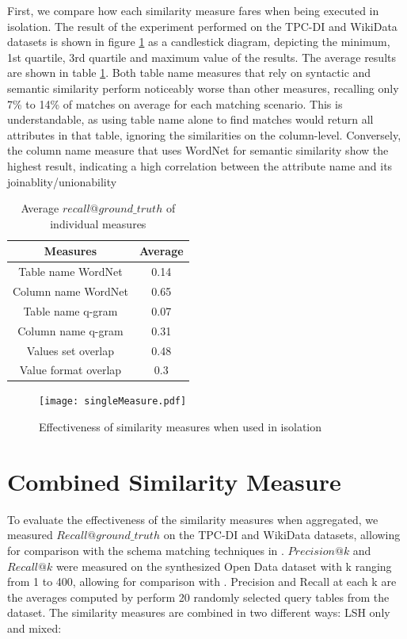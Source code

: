 First, we compare how each similarity measure fares when being executed in isolation. The result of the experiment performed on the TPC-DI and WikiData datasets is shown in figure \ref{fig:singleMeasure} as a candlestick diagram, depicting the minimum, 1st quartile, 3rd quartile and maximum value of the results. The average results are shown in table \ref{tab:averageRecallSingleMeasure}. Both table name measures that rely on syntactic and semantic similarity perform noticeably worse than other measures, recalling only 7\% to 14\% of matches on average for each matching scenario. This is understandable, as using table name alone to find matches would return all attributes in that table, ignoring the similarities on the column-level. Conversely, the column name measure that uses WordNet for semantic similarity show the highest result, indicating a high correlation between the attribute name and its joinablity/unionability

\begin{table}[ht]
    \centering
    \begin{tabular}{|c|c|}
        \hline
        Measures  & Average \\
        \hline
        Table name WordNet & 0.14 \\
        Column name WordNet & 0.65 \\
        Table name q-gram & 0.07 \\
        Column name q-gram & 0.31 \\
        Values set overlap & 0.48 \\
        Value format overlap & 0.3 \\
        \hline
    \end{tabular}
    \caption{Average $recall@ground\_truth$ of individual measures}
    \label{tab:averageRecallSingleMeasure}
\end{table}

\begin{figure}[ht]
    \centering
    \texttt{[image: singleMeasure.pdf]}
    \caption{Effectiveness of similarity measures when used in isolation}
    \label{fig:singleMeasure}
\end{figure}

\section{Combined Similarity Measure}\label{combinedMeasures}

To evaluate the effectiveness of the similarity measures when aggregated, we measured $Recall@ground\_truth$ on the TPC-DI and WikiData datasets, allowing for comparison with the schema matching techniques in \cite{valentine}. $Precision@k$ and $Recall@k$ were measured on the synthesized Open Data dataset with k ranging from 1 to 400, allowing for comparison with \cite{d3l}. Precision and Recall at each k are the averages computed by perform 20 randomly selected query tables from the dataset. The similarity measures are combined in two different ways: LSH only and mixed:

